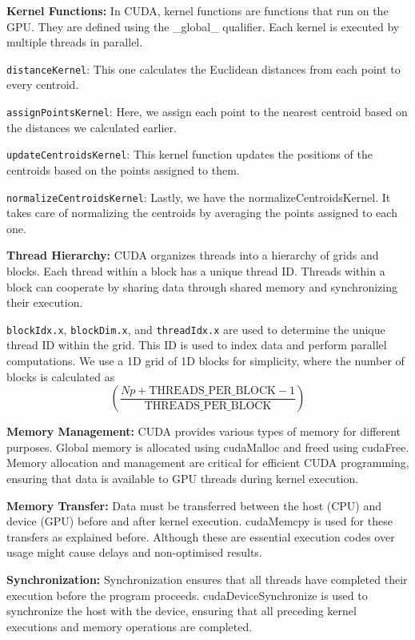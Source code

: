 \documentclass{article}
\begin{document}
\textbf{Kernel Functions:} In CUDA, kernel functions are functions that run on the GPU. They are defined using the \_global\_ qualifier. Each kernel is executed by multiple threads in parallel. 

\texttt{distanceKernel}: This one calculates the Euclidean distances from each point to every centroid.

\texttt{assignPointsKernel}: Here, we assign each point to the nearest centroid based on the distances we calculated earlier.

\texttt{updateCentroidsKernel}: This kernel function updates the positions of the centroids based on the points assigned to them.

\texttt{normalizeCentroidsKernel}: Lastly, we have the normalizeCentroidsKernel. It takes care of normalizing the centroids by averaging the points assigned to each one.


\textbf{Thread Hierarchy:}  CUDA organizes threads into a hierarchy of grids and blocks. Each thread within a block has a unique thread ID. Threads within a block can cooperate by sharing data through shared memory and synchronizing their execution. 

\texttt{blockIdx.x}, \texttt{blockDim.x}, and \texttt{threadIdx.x} are used to determine the unique thread ID within the grid. This ID is used to index data and perform parallel computations.
We use a 1D grid of 1D blocks for simplicity, where the number of blocks is calculated as \[
\left(\frac{Np + \text{THREADS\_PER\_BLOCK} - 1}{\text{THREADS\_PER\_BLOCK}}\right)
\]

\textbf{Memory Management:} CUDA provides various types of memory for different purposes. Global memory is allocated using cudaMalloc and freed using cudaFree. Memory allocation and management are critical for efficient CUDA programming, ensuring that data is available to GPU threads during kernel execution. 

\textbf{Memory Transfer:} Data must be transferred between the host (CPU) and device (GPU) before and after kernel execution. cudaMemcpy is used for these transfers as explained before. Although these are essential execution codes over usage might cause delays and non-optimised results.

\textbf{Synchronization:} Synchronization ensures that all threads have completed their execution before the program proceeds. cudaDeviceSynchronize is used to synchronize the host with the device, ensuring that all preceding kernel executions and memory operations are completed.
\end{document}
